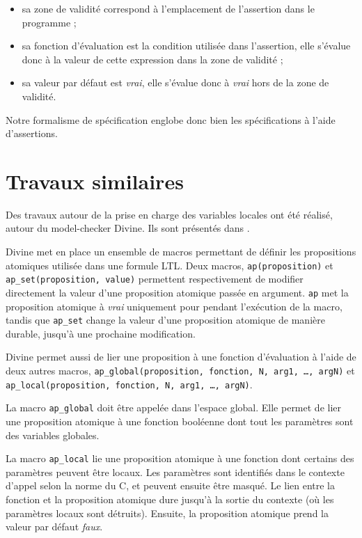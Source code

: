\begin{itemize}
\item
  sa zone de validité correspond à l'emplacement de l'assertion dans le
  programme ;
\item
  sa fonction d'évaluation est la condition utilisée dans l'assertion,
  elle s'évalue donc à la valeur de cette expression dans la zone de
  validité ;
\item
  sa valeur par défaut est \emph{vrai}, elle s'évalue donc à \emph{vrai}
  hors de la zone de validité.
\end{itemize}

Notre formalisme de spécification englobe donc bien les spécifications à l'aide
d'assertions.

\section{Travaux similaires}\label{sec:related_work}

Des travaux autour de la prise en charge des variables locales ont été réalisé,
autour du model-checker Divine\cite{Divine_3_0}. Ils sont présentés dans
\cite{Divine_LTL}.

Divine met en place un ensemble de macros permettant de définir les propositions
atomiques utilisée dans une formule LTL. Deux macros, \texttt{ap(proposition)}
et \texttt{ap\_set(proposition, value)} permettent respectivement de modifier
directement la valeur d'une proposition atomique passée en argument. \texttt{ap}
met la proposition atomique à \emph{vrai} uniquement pour pendant l'exécution de
la macro, tandis que \texttt{ap\_set} change la valeur d'une proposition
atomique de manière durable, jusqu'à une prochaine modification.

Divine permet aussi de lier une proposition à une fonction d'évaluation à l'aide
de deux autres macros, \texttt{ap\_global(proposition, fonction, N, arg1, \dots,
  argN)} et\\
\texttt{ap\_local(proposition, fonction, N, arg1, \dots, argN)}.

La macro \texttt{ap\_global} doit être appelée dans l'espace global. Elle permet
de lier une proposition atomique à une fonction booléenne dont tout les
paramètres sont des variables globales.

La macro \texttt{ap\_local} lie une proposition atomique à une fonction dont
certains des paramètres peuvent être locaux. Les paramètres sont identifiés
dans le contexte d'appel selon la norme du C, et peuvent ensuite être masqué.
Le lien entre la fonction et la proposition atomique dure jusqu'à la sortie du
contexte (où les paramètres locaux sont détruits). Ensuite, la proposition
atomique prend la valeur par défaut \emph{faux}.

